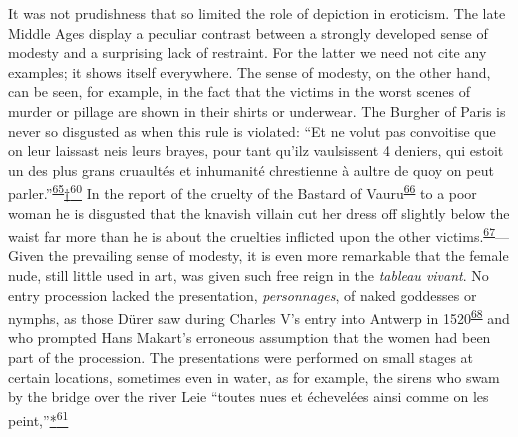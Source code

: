 It was not prudishness that so limited the role of depiction in
eroticism. The late Middle Ages display a peculiar contrast between a
strongly developed sense of modesty and a surprising lack of restraint.
For the latter we need not cite any examples; it shows itself
everywhere. The sense of modesty, on the other hand, can be seen, for
example, in the fact that the victims in the worst scenes of murder or
pillage are shown in their shirts or underwear. The Burgher of Paris is
never so disgusted as when this rule is violated: ``Et ne volut pas
convoitise que on leur laissast neis leurs brayes, pour tant qu'ilz
vaulsissent 4 deniers, qui estoit un des plus grans cruaultés et
inhumanité chrestienne à aultre de quoy on peut
parler.''\textsuperscript{\protect\hypertarget{21_Chapter_Thirteen__IMAGE_AND_WORD.xhtmlux5cux23id_182}{\protect\hyperlink{23_NOTES.xhtmlux5cux23id_183}{65}}}\protect\hypertarget{21_Chapter_Thirteen__IMAGE_AND_WORD.xhtmlux5cux23id_2833}{\protect\hyperlink{23_NOTES.xhtmlux5cux23id_2834}{†\textsuperscript{60}}}
In the report of the cruelty of the Bastard of
Vauru\textsuperscript{\protect\hypertarget{21_Chapter_Thirteen__IMAGE_AND_WORD.xhtmlux5cux23id_180}{\protect\hyperlink{23_NOTES.xhtmlux5cux23id_181}{66}}}
to a poor woman he is disgusted that the knavish villain cut her dress
\protect\hypertarget{21_Chapter_Thirteen__IMAGE_AND_WORD.xhtmlux5cux23page_374}{}{}off
slightly below the waist far more than he is about the cruelties
inflicted upon the other
victims.\textsuperscript{\protect\hypertarget{21_Chapter_Thirteen__IMAGE_AND_WORD.xhtmlux5cux23id_178}{\protect\hyperlink{23_NOTES.xhtmlux5cux23id_179}{67}}}---Given
the prevailing sense of modesty, it is even more remarkable that the
female nude, still little used in art, was given such free reign in the
\emph{tableau vivant}. No entry procession lacked the presentation,
\emph{personnages}, of naked goddesses or nymphs, as those Dürer saw
during Charles V's entry into Antwerp in
1520\textsuperscript{\protect\hypertarget{21_Chapter_Thirteen__IMAGE_AND_WORD.xhtmlux5cux23id_176}{\protect\hyperlink{23_NOTES.xhtmlux5cux23id_177}{68}}}
and who prompted Hans Makart's erroneous assumption that the women had
been part of the procession. The presentations were performed on small
stages at certain locations, sometimes even in water, as for example,
the sirens who swam by the bridge over the river Leie ``toutes nues et
échevelées ainsi comme on les
peint,''\protect\hypertarget{21_Chapter_Thirteen__IMAGE_AND_WORD.xhtmlux5cux23id_2831}{\protect\hyperlink{23_NOTES.xhtmlux5cux23id_2832}{*\textsuperscript{61}}}
